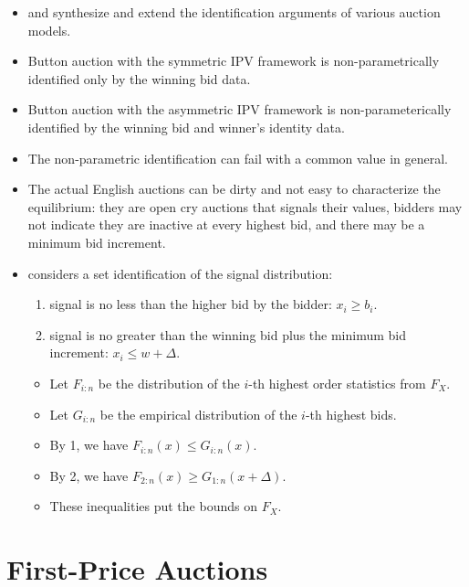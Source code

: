 \documentclass[]{book}
\providecommand{\tightlist}{%
  \setlength{\itemsep}{0pt}\setlength{\parskip}{0pt}}
\begin{document}
\begin{itemize}
\tightlist
\item
  \citet{atheyIdentificationStandardAuction2002} and
  \citet{atheyChapter60Nonparametric2007} synthesize and extend the
  identification arguments of various auction models.
\item
  Button auction with the symmetric IPV framework is non-parametrically
  identified only by the winning bid data.
\item
  Button auction with the asymmetric IPV framework is
  non-parameterically identified by the winning bid and winner's
  identity data.
\item
  The non-parametric identification can fail with a common value in
  general.
\item
  The actual English auctions can be dirty and not easy to characterize
  the equilibrium: they are open cry auctions that signals their values,
  bidders may not indicate they are inactive at every highest bid, and
  there may be a minimum bid increment.
\item
  \citet{haileInferenceIncompleteModel2003} considers a set
  identification of the signal distribution:

  \begin{enumerate}
  \def\labelenumi{\arabic{enumi}.}
  \tightlist
  \item
    signal is no less than the higher bid by the bidder:
    \(x_i \ge b_i\).
  \item
    signal is no greater than the winning bid plus the minimum bid
    increment: \(x_i \le w + \Delta\).
  \end{enumerate}

  \begin{itemize}
  \tightlist
  \item
    Let \(F_{i:n}\) be the distribution of the \(i\)-th highest order
    statistics from \(F_X\).
  \item
    Let \(G_{i:n}\) be the empirical distribution of the \(i\)-th
    highest bids.
  \item
    By 1, we have \(F_{i:n}(x) \le G_{i:n}(x)\).
  \item
    By 2, we have \(F_{2:n}(x) \ge G_{1:n}(x + \Delta)\).
  \item
    These inequalities put the bounds on \(F_X\).
  \end{itemize}
\end{itemize}

\section{First-Price Auctions}\label{first-price-auctions}
\end{document}
